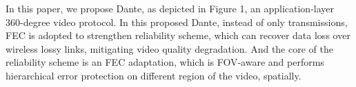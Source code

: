 In this paper, we propose Dante, as depicted in Figure 1, an application-layer 360-degree video protocol.
In this proposed Dante, instead of only transmissions, FEC is adopted to strengthen reliability scheme, which can recover data loss over wireless lossy links, mitigating video quality degradation. 
And the core of the reliability scheme is an FEC adaptation, which is FOV-aware and performs hierarchical error protection on different region of the video, spatially.




